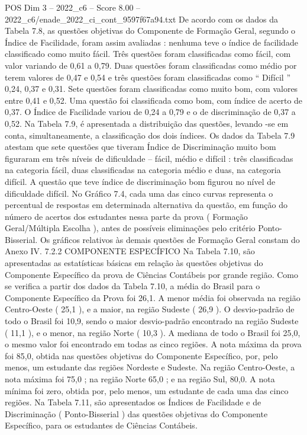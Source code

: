 \begin{textsample}{POS Dim 3 – 2022\_c6 – Score 8.00 – 2022\_c6/enade\_2022\_ci\_cont\_9597f67a94.txt}
De acordo com os dados da Tabela 7.8, as questões objetivas do Componente de Formação Geral, segundo o Índice de Facilidade, foram assim avaliadas : nenhuma teve o índice de facilidade classificado como muito fácil.
Três questões foram classificadas como fácil, com valor variando de 0,61 a 0,79.
Duas questões foram classificadas como médio por terem valores de 0,47 e 0,54 e três questões foram classificadas como “ Difícil ” 0,24, 0,37 e 0,31.
Sete questões foram classificadas como muito bom, com valores entre 0,41 e 0,52.
Uma questão foi classificada como bom, com índice de acerto de 0,37.
O Índice de Facilidade variou de 0,24 a 0,79 e o de discriminação de 0,37 a 0,52.
Na Tabela 7.9, é apresentada a distribuição das questões, levando -se em conta, simultaneamente, a classificação dos dois índices.
Os dados da Tabela 7.9 atestam que sete questões que tiveram Índice de Discriminação muito bom figuraram em três níveis de dificuldade – fácil, médio e difícil : três classificadas na categoria fácil, duas classificadas na categoria médio e duas, na categoria difícil.
A questão que teve índice de discriminação bom figurou no nível de dificuldade difícil.
No Gráfico 7.4, cada uma das cinco curvas representa o percentual de respostas em determinada alternativa da questão, em função do número de acertos dos estudantes nessa parte da prova ( Formação Geral/Múltipla Escolha ), antes de possíveis eliminações pelo critério Ponto-Bisserial.
Os gráficos relativos às demais questões de Formação Geral constam do Anexo IV. 7.2.2 COMPONENTE ESPECÍFICO Na Tabela 7.10, são apresentadas as estatísticas básicas em relação às questões objetivas do Componente Específico da prova de Ciências Contábeis por grande região.
Como se verifica a partir dos dados da Tabela 7.10, a média do Brasil para o Componente Específico da Prova foi 26,1.
A menor média foi observada na região Centro-Oeste ( 25,1 ), e a maior, na região Sudeste ( 26,9 ).
O desvio-padrão de todo o Brasil foi 10,9, sendo o maior desvio-padrão encontrado na região Sudeste ( 11,1 ), e o menor, na região Norte ( 10,3 ).
A mediana de todo o Brasil foi 25,0, o mesmo valor foi encontrado em todas as cinco regiões.
A nota máxima da prova foi 85,0, obtida nas questões objetivas do Componente Específico, por, pelo menos, um estudante das regiões Nordeste e Sudeste.
Na região Centro-Oeste, a nota máxima foi 75,0 ; na região Norte 65,0 ; e na região Sul, 80,0.
A nota mínima foi zero, obtida por, pelo menos, um estudante de cada uma das cinco regiões.
Na Tabela 7.11, são apresentados os Índices de Facilidade e de Discriminação ( Ponto-Bisserial ) das questões objetivas do Componente Específico, para os estudantes de Ciências Contábeis.

\end{textsample}
